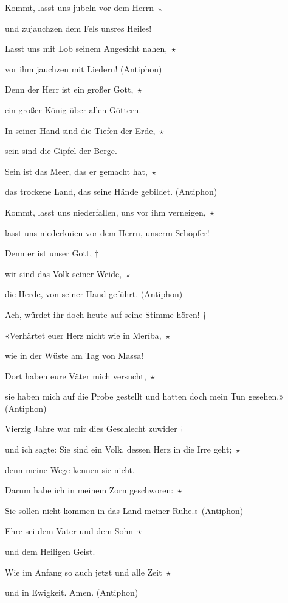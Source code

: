 Kommt, lasst uns jubeln vor dem Herrn~$\star$~\nopagebreak

und zujauchzen dem Fels unsres Heiles!

Lasst uns mit Lob seinem Angesicht nahen,~$\star$~\nopagebreak

vor ihm jauchzen mit Liedern! (Antiphon)

\vspace{5pt}

Denn der Herr ist ein großer Gott,~$\star$~\nopagebreak

ein großer König über allen Göttern.

In seiner Hand sind die Tiefen der Erde,~$\star$~\nopagebreak

sein sind die Gipfel der Berge.

Sein ist das Meer, das er gemacht hat,~$\star$~\nopagebreak

das trockene Land, das seine Hände gebildet. (Antiphon)
 
 \vspace{5pt}

Kommt, lasst uns niederfallen, uns vor ihm verneigen,~$\star$~\nopagebreak

lasst uns niederknien vor dem Herrn, unserm Schöpfer!

Denn er ist unser Gott, † 

wir sind das Volk seiner Weide,~$\star$~\nopagebreak

die Herde, von seiner Hand geführt. (Antiphon)

\vspace{5pt} 

Ach, würdet ihr doch heute auf seine Stimme hören! † 

«Verhärtet euer Herz nicht wie in Meríba,~$\star$~\nopagebreak

wie in der Wüste am Tag von Massa!

Dort haben eure Väter mich versucht,~$\star$~\nopagebreak

sie haben mich auf die Probe gestellt und hatten doch mein Tun gesehen.» (Antiphon)
 
 \vspace{5pt}

Vierzig Jahre war mir dies Geschlecht zuwider † 

und ich sagte: Sie sind ein Volk, dessen Herz in die Irre geht;~$\star$~\nopagebreak

denn meine Wege kennen sie nicht.

Darum habe ich in meinem Zorn geschworen:~$\star$~\nopagebreak

Sie sollen nicht kommen in das Land meiner Ruhe.» (Antiphon)
 
\vspace{5pt}

Ehre sei dem Vater und dem Sohn~$\star$~\nopagebreak

und dem Heiligen Geist.

Wie im Anfang so auch jetzt und alle Zeit~$\star$~\nopagebreak

und in Ewigkeit. Amen. (Antiphon)